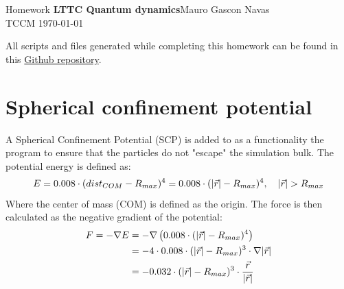 \documentclass{cis320}
\begin{document}
\noindent Homework \textbf{LTTC Quantum dynamics}\hfill  Mauro Gascon Navas\\
TCCM \today

\hrulefill
\par
\vspace{1cm} 
All scripts and files generated while completing this homework can be found in this \textcolor{blue}{\href{https://github.com/EliteSushi/LTTC2025/tree/main/Molecular_Dynamics}{Github repository}}.

\section{Spherical confinement potential}

A Spherical Confinement Potential (SCP) is added to as a functionality the program to ensure that the particles do not "escape" the simulation bulk. The potential energy is defined as:
\[
E = 0.008 \cdot (dist_{COM}-R_{max})^4 = 0.008 \cdot (\abs{\vec{r}}-R_{max})^4, \quad \abs{\vec{r}} > R_{max} 
\]
Where the center of mass (COM) is defined as the origin. The force is then calculated as the negative gradient of the potential:
\[
\begin{aligned}
F = -\nabla E &= -\nabla \left( 0.008 \cdot (\abs{\vec{r}}-R_{max})^4 \right) \\
&= -4 \cdot 0.008 \cdot (\abs{\vec{r}}-R_{max})^3 \cdot \nabla \abs{\vec{r}} \\
&=-0.032 \cdot (\abs{\vec{r}}-R_{max})^3 \cdot \frac{\vec{r}}{\abs{\vec{r}}}
\end{aligned}
\]
\end{document}
